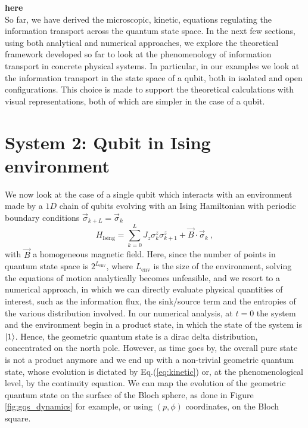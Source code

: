 \documentclass[draft,nofootinbib,pre,twocolumn,showpacs,showkeys,preprintnumbers,floatfix]{revtex4-1}
\newcommand{\1}{\mathbbm{1}}
\begin{document}
{\bf here}\\

So far, we have derived the microscopic, kinetic, equations regulating the 
information transport across the quantum state space. In the next few sections, using
both analytical and numerical approaches, we explore the theoretical framework developed
so far to look at the phenomenology of information transport in concrete physical systems. 
In particular, in our examples we look at the information transport in the state 
space of a qubit, both in isolated and open configurations. This choice is made 
to support the theoretical calculations with visual representations, both of which 
are simpler in the case of a qubit.


\section{System 2: Qubit in Ising environment}
\label{sec:EXAMPLES2}

We now look at the case of a single qubit which interacts with an environment 
made by a $1D$ chain of qubits evolving with an Ising Hamiltonian with periodic
boundary conditions $\vec{\sigma}_{k+L}= \vec{\sigma}_k$
\begin{equation}
H_{\mathrm{Ising}} = \sum_{k=0}^{L} J_z \sigma_k^z \sigma_{k+1}^{z} + \vec{B} \cdot \vec{\sigma}_k~,
\end{equation}
with $\vec{B}$ a homogeneous magnetic field. Here, since the number of points
in quantum state space is $2^{L_{\mathrm{env}}}$, where $L_{\mathrm{env}}$
is the size of the environment, solving the equations of motion analytically becomes
unfeasible, and we resort to a numerical approach, in which we can directly evaluate
physical quantities of interest, such as the information flux, the sink/source term and
the entropies of the various distribution involved. In our numerical analysis, at $t=0$
the system and the environment begin in a product state, in which the state of the system
is $\ket{1}$. Hence, the geometric quantum state is a dirac delta distribution, concentrated 
on the north pole. However, as time goes by, the overall pure state is not a product anymore
and we end up with a non-trivial geometric quantum state, whose evolution
is dictated by Eq.(\ref{eq:kinetic}) or, at the phenomenological level, by the continuity equation. 
We can map the evolution of the geometric quantum state on the surface of the Bloch sphere, 
as done in Figure \ref{fig:gqs_dynamics} for example, or using $(p,\phi)$ coordinates, on the 
Bloch square. 
\end{document}
